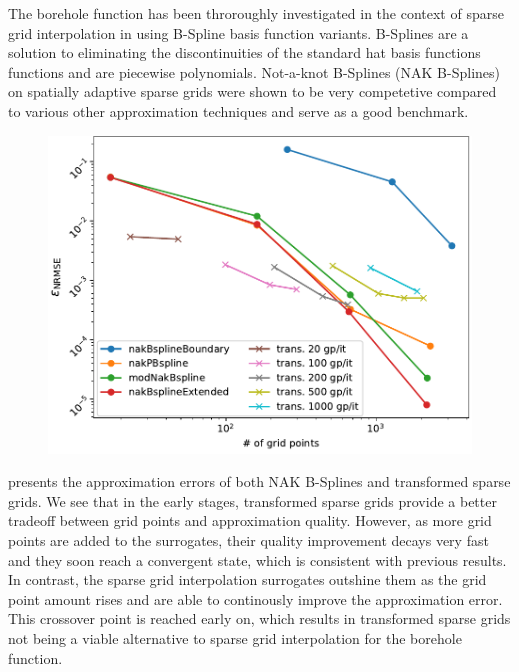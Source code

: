 \documentclass[
  a4paper,  %
  twoside,  %
  bibliography=totoc,
  headsepline,
  cleardoublepage=empty,
  parskip=half,
  draft=false
]{scrbook}
\begin{document}
The borehole function has been throroughly investigated in the context of sparse grid interpolation in \cite{} using B-Spline basis function variants.
B-Splines are a solution to eliminating the discontinuities of the standard hat basis functions functions and are piecewise polynomials.
Not-a-knot B-Splines (NAK B-Splines) on spatially adaptive sparse grids were shown to be very competetive compared to various other approximation techniques and serve as a good benchmark.

\begin{mdframed}[style=style]
\begin{figure}[H]
\includegraphics[width=\textwidth]{graphics/borehole}
\delimit
{}
\label{fig:borehole_comp}
\end{figure}
\end{mdframed}

 presents the approximation errors of both NAK B-Splines and transformed sparse grids.
We see that in the early stages, transformed sparse grids provide a better tradeoff between grid points and approximation quality.
However, as more grid points are added to the surrogates, their quality improvement decays very fast and they soon reach a convergent state, which is consistent with previous results.
In contrast, the sparse grid interpolation surrogates outshine them as the grid point amount rises and are able to continously improve the approximation error.
This crossover point is reached early on, which results in transformed sparse grids not being a viable alternative to sparse grid interpolation for the borehole function.
\end{document}
